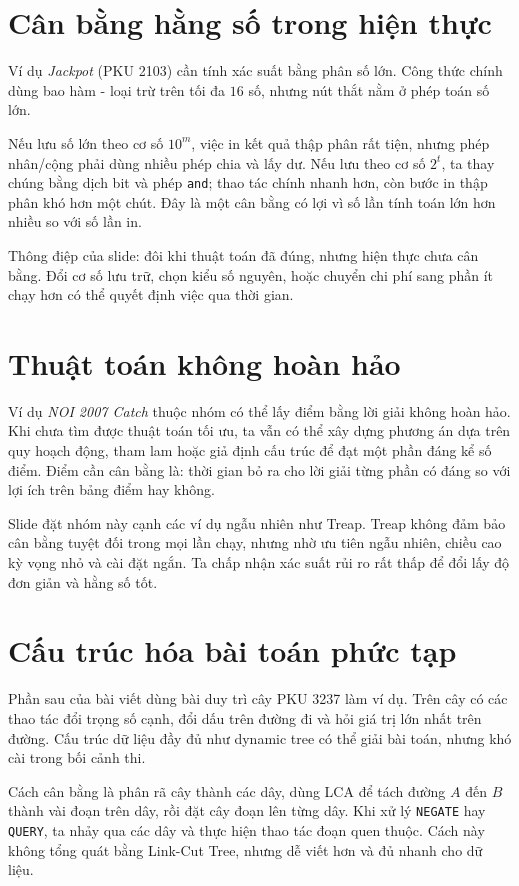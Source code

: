 \documentclass[11pt]{article}
\begin{document}
\section{Cân bằng hằng số trong hiện thực}

Ví dụ \textit{Jackpot} (PKU 2103) cần tính xác suất bằng phân số lớn. Công
thức chính dùng bao hàm - loại trừ trên tối đa \(16\) số, nhưng nút thắt nằm ở
phép toán số lớn.

Nếu lưu số lớn theo cơ số \(10^m\), việc in kết quả thập phân rất tiện, nhưng
phép nhân/cộng phải dùng nhiều phép chia và lấy dư. Nếu lưu theo cơ số
\(2^t\), ta thay chúng bằng dịch bit và phép \texttt{and}; thao tác chính
nhanh hơn, còn bước in thập phân khó hơn một chút. Đây là một cân bằng có lợi
vì số lần tính toán lớn hơn nhiều so với số lần in.

Thông điệp của slide: đôi khi thuật toán đã đúng, nhưng hiện thực chưa cân
bằng. Đổi cơ số lưu trữ, chọn kiểu số nguyên, hoặc chuyển chi phí sang phần ít
chạy hơn có thể quyết định việc qua thời gian.

\section{Thuật toán không hoàn hảo}

Ví dụ \textit{NOI 2007 Catch} thuộc nhóm có thể lấy điểm bằng lời giải không
hoàn hảo. Khi chưa tìm được thuật toán tối ưu, ta vẫn có thể xây dựng phương
án dựa trên quy hoạch động, tham lam hoặc giả định cấu trúc để đạt một phần
đáng kể số điểm. Điểm cần cân bằng là: thời gian bỏ ra cho lời giải từng phần
có đáng so với lợi ích trên bảng điểm hay không.

Slide đặt nhóm này cạnh các ví dụ ngẫu nhiên như Treap. Treap không đảm bảo
cân bằng tuyệt đối trong mọi lần chạy, nhưng nhờ ưu tiên ngẫu nhiên, chiều cao
kỳ vọng nhỏ và cài đặt ngắn. Ta chấp nhận xác suất rủi ro rất thấp để đổi lấy
độ đơn giản và hằng số tốt.

\section{Cấu trúc hóa bài toán phức tạp}

Phần sau của bài viết dùng bài duy trì cây PKU 3237 làm ví dụ. Trên cây có
các thao tác đổi trọng số cạnh, đổi dấu trên đường đi và hỏi giá trị lớn nhất
trên đường. Cấu trúc dữ liệu đầy đủ như dynamic tree có thể giải bài toán, nhưng
khó cài trong bối cảnh thi.

Cách cân bằng là phân rã cây thành các dây, dùng LCA để tách đường \(A\) đến
\(B\) thành vài đoạn trên dây, rồi đặt cây đoạn lên từng dây. Khi xử lý
\texttt{NEGATE} hay \texttt{QUERY}, ta nhảy qua các dây và thực hiện thao tác
đoạn quen thuộc. Cách này không tổng quát bằng Link-Cut Tree, nhưng dễ viết
hơn và đủ nhanh cho dữ liệu.
\end{document}
